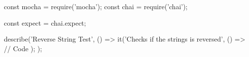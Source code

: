 const mocha = require('mocha');
const chai = require('chai');

const expect = chai.expect;

describe('Reverse String Test', () => {
    it('Checks if the strings is reversed', () => {
        // Code 
    });
});